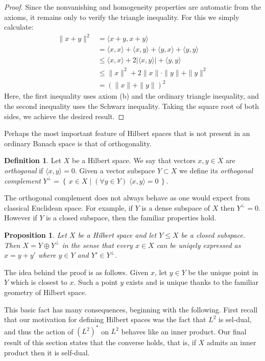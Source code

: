 \documentclass[11pt,oneside]{amsbook}
\newcommand{\set}[1]{\left\{\,#1\,\right\}}
\theoremstyle{definition}
\theoremstyle{plain}
\newtheorem{prop}[thm]{Proposition}
\theoremstyle{definition}
\newtheorem{defn}[thm]{Definition}
\theoremstyle{remark}
\numberwithin{equation}{section}
\numberwithin{figure}{section}
\begin{document}
\begin{proof}
  Since the nonvanishing and homogeneity properties are automatic from the axioms, it remains only to verify the triangle inequality. For this we simply calculate:
  \begin{align*}
    \|x+y\|^2&=\langle x+y,x+y\rangle\\
             &=\langle x,x\rangle+\langle x,y\rangle+\langle y,x\rangle+\langle y,y\rangle\\
             &\leq \langle x,x\rangle+2|\langle x,y\rangle|+\langle y,y\rangle\\
             &\leq\|x\|^2+2\|x\|\cdot\|y\|+\|y\|^2\\
             &=(\|x\|+\|y\|)^2
  \end{align*}
  Here, the first inequality uses axiom (b) and the ordinary triangle inequality, and the second inequality uses the Schwarz inequality. Taking the square root of both sides, we achieve the desired result.
\end{proof}

Perhaps the most important feature of Hilbert spaces that is not present in an ordinary Banach space is that of orthogonality.

\begin{defn}
  Let $X$ be a Hilbert space. We say that vectors $x,y\in X$ are \emph{orthogonal} if $\langle x,y\rangle=0$. Given a vector subspace $Y\subset X$ we define its \emph{orthogonal complement} $Y^\perp=\set{x\in X\mid(\forall y\in Y)\;\langle x,y\rangle=0}$.
\end{defn}

The orthogonal complement does not always behave as one would expect from classical Euclidean space. For example, if $Y$ is a dense subspace of $X$ then $Y^\perp=0$. However if $Y$ is a closed subspace, then the familiar properties hold.

\begin{prop}
  Let $X$ be a Hilbert space and let $Y\leq X$ be a closed subspace. Then $X=Y\oplus Y^\perp$ in the sense that every $x\in X$ can be uniqely expressed as $x=y+y'$ where $y\in Y$ and $Y'\in Y^\perp$.
\end{prop}

The idea behind the proof is as follows. Given $x$, let $y\in Y$ be the unique point in $Y$ which is closest to $x$. Such a point $y$ exists and is unique thanks to the familiar geometry of Hilbert space.

This basic fact has many consequences, beginning with the following. First recall that our motivation for defining Hilbert spaces was the fact that $L^2$ is sel-dual, and thus the action of $(L^2)^*$ on $L^2$ behaves like an inner product. Our final result of this section states that the converse holds, that is, if $X$ admits an inner product then it is self-dual.
\end{document}
